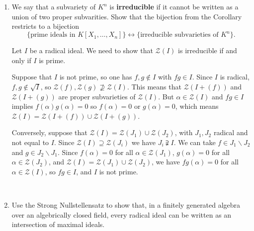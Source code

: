 \documentclass[12pt]{amsart}
\newcommand{\1}{\mathbbm{1}}
\newcommand{\cZ}{\mathcal{Z}}
\newcommand{\solution}[1]{\ifthenelse {\equal{\displaysol}{1}} {\begin{framed}{\color{meretale}\noindent #1}\end{framed}} { \ }}
\newcommand\itemB{\stepcounter{enumi}\item[(\theenumi)]}
\begin{document}
\begin{enumerate}
\

\

\itemB We say that a subvariety of $K^n$ is \textbf{irreducible} if it cannot be written as a union of two proper subvarities. Show that the bijection from the Corollary restricts to a bijection
\[ \{ \text{prime ideals in $K[X_1,\dots,X_n]$}\}  \longleftrightarrow \{ \text{irreducible subvarieties of $K^n$}\}.\]

\solution{Let $I$ be a radical ideal. We need to show that $\cZ(I)$ is irreducible if and only if $I$ is prime.

Suppose that $I$ is not prime, so one has $f,g\notin I$ with $fg\in I$. Since $I$ is radical, $f,g\notin \sqrt{I}$, so $\cZ(f) , \cZ(g) \not \supseteq \cZ(I)$. This means that $\cZ(I + (f))$ and $\cZ(I+(g))$ are proper subvarieties of $\cZ(I)$. But $\alpha\in \cZ(I)$ and $fg\in I$ implies $f(\alpha)g(\alpha)=0$ so $f(\alpha)=0$ or $g(\alpha)=0$, which means $\cZ(I) = \cZ(I + (f)) \cup \cZ(I + (g))$.

Conversely, suppose that $\cZ(I) = \cZ(J_1) \cup \cZ(J_2)$, with $J_1,J_2$ radical and not equal to $I$. Since $\cZ(I) \supseteq \cZ(J_i)$ we have $J_i \supsetneqq I$. We can take $f\in J_1 \smallsetminus J_2$ and $g\in J_2 \smallsetminus J_1$. Since $f(\alpha)=0$ for all $\alpha\in  \cZ(J_1)$, $g(\alpha)=0$ for all $\alpha\in \cZ(J_2)$, and $\cZ(I) = \cZ(J_1) \cup \cZ(J_2)$, we have $fg(\alpha)=0$ for all $\alpha\in \cZ(I)$, so $fg\in I$, and $I$ is not prime.}


\itemB Use the Strong Nullstellensatz to show that, in a finitely generated algebra over an algebrically closed field, every radical ideal can be written as an intersection of maximal ideals.




\end{enumerate}
\vfill
\end{document}
